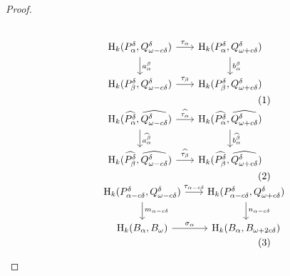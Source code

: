 \begin{proof}
\begin{scriptsize}
\begin{subequations}
\begin{minipage}{0.5\textwidth}
\begin{equation}
\begin{tikzcd}[column sep=scriptsize]
    \hom_k(\P_\alpha, \Q^\of)\arrow{r}{\tau_\alpha} \arrow{d}{a_\alpha^\beta} &
    \hom_k(\P_\alpha, \QQ^\of)\arrow{d}{b_\alpha^\beta} \\
    \hom_k(\P_\beta, \Q^\of)\arrow{r}{\tau_\beta} &
    \hom_k(\P_\beta, \QQ^\of)
  \end{tikzcd}\end{equation}
  \begin{equation}\label{dgm:intr_tight1e}
  \begin{tikzcd}[column sep=scriptsize]
    \hom_k(\ext{\P_\alpha}, \ext{\Q^\of})\arrow{r}{\ext{\tau_\alpha}} \arrow{d}{\ext{a_\alpha^\beta}} &
    \hom_k(\ext{\P_\alpha}, \ext{\QQ^\of})\arrow{d}{\ext{b_\alpha^\beta}} \\
    \hom_k(\ext{\P_\beta}, \ext{\Q^\of})\arrow{r}{\ext{\tau_\beta}} &
    \hom_k(\ext{\P_\beta}, \ext{\QQ^\of})
  \end{tikzcd}\end{equation}
  \begin{equation}\label{dgm:intr_tight1f}
  \begin{tikzcd}[column sep=scriptsize]
    \hom_k(\P_{\alpha-c\of}, \Q^\delta)\arrow{r}{\tau_{\alpha-c\of}} \arrow{d}{m_{\alpha-c\of}} &
    \hom_k(\P_{\alpha-c\of}, \QQ^\delta)\arrow{d}{n_{\alpha-c\of}} \\
    \hom_k(B_\alpha, \B)\arrow{r}{\sigma_\alpha} &
    \hom_k(B_\alpha, \BB)
  \end{tikzcd}\end{equation}\end{minipage}
  \end{subequations}\vspace{3ex}
  \end{scriptsize}


\end{proof}
